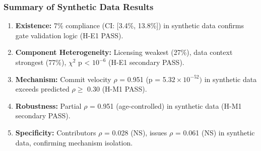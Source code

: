 \subsubsection{Summary of Synthetic Data Results}

\begin{enumerate}
\item \textbf{Existence:} 7\% compliance (CI: [3.4\%, 13.8\%]) in synthetic data confirms gate validation logic (H-E1 PASS).
\item \textbf{Component Heterogeneity:} Licensing weakest (27\%), data context strongest (77\%), $\chi^2$ p < $10^{-6}$ (H-E1 secondary PASS).
\item \textbf{Mechanism:} Commit velocity $\rho$ = 0.951 (p = 5.$32\times 10^{-52})$ in synthetic data exceeds predicted $\rho \geq$ 0.30 (H-M1 PASS).
\item \textbf{Robustness:} Partial $\rho$ = 0.951 (age-controlled) in synthetic data (H-M1 secondary PASS).
\item \textbf{Specificity:} Contributors $\rho$ = 0.028 (NS), issues $\rho$ = 0.061 (NS) in synthetic data, confirming mechanism isolation.
\end{enumerate}
